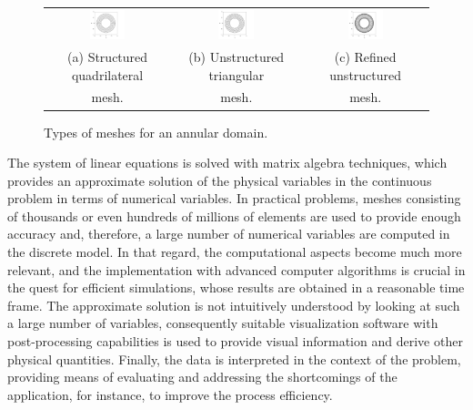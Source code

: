 \begin{figure}[!htb]
\centering
\begin{tabular}{@{}c@{\hskip 0.5cm}c@{\hskip 0.5cm}c@{}}
\includegraphics[width=0.3\textwidth]{chap1/include/figures/structured_mesh.pdf}
& \includegraphics[width=0.3\textwidth]{chap1/include/figures/unstructured_mesh.pdf}
& \includegraphics[width=0.3\textwidth]{chap1/include/figures/locally_refined_mesh.pdf}\\
\small(a) Structured quadrilateral & \small (b) Unstructured triangular & \small (c) Refined unstructured\\
\small mesh. & \small mesh. & \small mesh.
\end{tabular}
\caption{Types of meshes for an annular domain.}
\label{chap1:fig:computational_modelling_meshes}
\end{figure}

The system of linear equations is solved with matrix algebra techniques, which provides an approximate solution of the physical variables in the continuous problem in terms of numerical variables.
In practical problems, meshes consisting of thousands or even hundreds of millions of elements are used to provide enough accuracy and, therefore, a large number of numerical variables are computed in the discrete model.
In that regard, the computational aspects become much more relevant, and the implementation with advanced computer algorithms is crucial in the quest for efficient simulations, whose results are obtained in a reasonable time frame.
The approximate solution is not intuitively understood by looking at such a large number of variables, consequently suitable visualization software with post-processing capabilities is used to provide visual information and derive other physical quantities.
Finally, the data is interpreted in the context of the problem, providing means of evaluating and addressing the shortcomings of the application, for instance, to improve the process efficiency.

